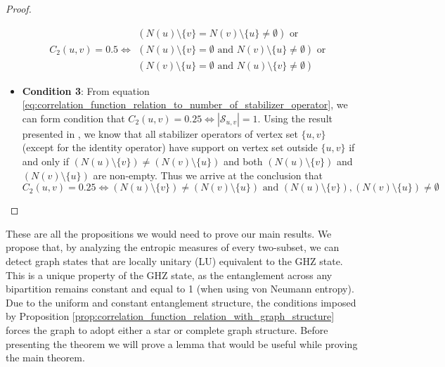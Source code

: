 \documentclass{article}
\begin{document}
\begin{proof}
\begin{itemize}
    $$C_2(u, v) = 0.5 \iff 
\begin{aligned}(N(u) \setminus \{v\} = N(v) \setminus \{u\} \neq \emptyset) \text{ or } \\
(N(u) \setminus \{v\} = \emptyset \text{ and } N(v) \setminus \{u\} \neq \emptyset) 
\text{ or } \\
(N(v) \setminus \{u\} = \emptyset \text{ and } N(u) \setminus \{v\} \neq \emptyset)
\end{aligned}$$

    
    \item \textbf{Condition 3}: From equation \ref{eq:correlation_function_relation_to_number_of_stabilizer_operator}, we can form condition that $C_2(u, v) = 0.25 \iff |\mathcal{S}_{u,v}| = 1$. Using the result presented in \cite{guhne2009entanglement}, we know that all stabilizer operators of vertex set $\{u, v\}$ (except for the identity operator) have support on vertex set outside $\{u, v\}$  if and only if $ (N(u) \setminus \{v\}) \neq (N(v) \setminus \{u\}) $ and both $ (N(u) \setminus \{v\}) $ and $ (N(v) \setminus \{u\}) $ are non-empty. Thus we arrive at the conclusion that 
    \begin{equation}
        C_2(u, v) = 0.25 \iff (N(u) \setminus \{v\}) \neq (N(v) \setminus \{u\}) \text{ and } (N(u) \setminus \{v\}), (N(v) \setminus \{u\}) \neq \emptyset
    \end{equation} 
\end{itemize}
\end{proof}

 These are all the propositions we would need to prove our main results. We propose that, by analyzing the entropic measures of every two-subset, we can detect graph states that are locally unitary (LU) equivalent to the GHZ state. This is a unique property of the GHZ state, as the entanglement across any bipartition remains constant and equal to 1 (when using von Neumann entropy). Due to the uniform and constant entanglement structure, the conditions imposed by Proposition \ref{prop:correlation_function_relation_with_graph_structure} forces the graph to adopt either a star or complete graph structure. Before presenting the theorem we will prove a lemma that would be useful while proving the main theorem.
 
\end{document}
